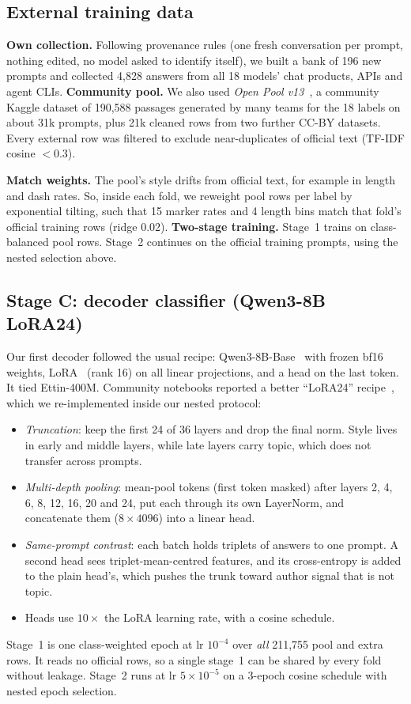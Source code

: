 \documentclass[10pt,twocolumn,letterpaper]{article}
\begin{document}
\subsection{External training data}
\label{sec:external}
\textbf{Own collection.} Following provenance rules (one fresh conversation per prompt, nothing edited, no model asked to identify itself), we built a bank of 196 new prompts and collected 4,828 answers from all 18 models' chat products, APIs and agent CLIs. \textbf{Community pool.} We also used \emph{Open Pool v13}~\cite{kaggle_pool}, a community Kaggle dataset of 190,588 passages generated by many teams for the 18 labels on about 31k prompts, plus 21k cleaned rows from two further CC-BY datasets. Every external row was filtered to exclude near-duplicates of official text (TF-IDF cosine $<0.3$).

\textbf{Match weights.} The pool's style drifts from official text, for example in length and dash rates. So, inside each fold, we reweight pool rows per label by exponential tilting, such that 15 marker rates and 4 length bins match that fold's official training rows (ridge 0.02). \textbf{Two-stage training.} Stage~1 trains on class-balanced pool rows. Stage~2 continues on the official training prompts, using the nested selection above.

\subsection{Stage C: decoder classifier (Qwen3-8B LoRA24)}
Our first decoder followed the usual recipe: Qwen3-8B-Base~\cite{yang2025qwen3} with frozen bf16 weights, LoRA~\cite{hu2022lora} (rank 16) on all linear projections, and a head on the last token. It tied Ettin-400M. Community notebooks reported a better ``LoRA24'' recipe~\cite{kaggle_lora24}, which we re-implemented inside our nested protocol:
\begin{itemize}
\item \emph{Truncation}: keep the first 24 of 36 layers and drop the final norm. Style lives in early and middle layers, while late layers carry topic, which does not transfer across prompts.
\item \emph{Multi-depth pooling}: mean-pool tokens (first token masked) after layers 2, 4, 6, 8, 12, 16, 20 and 24, put each through its own LayerNorm, and concatenate them ($8\times4096$) into a linear head.
\item \emph{Same-prompt contrast}: each batch holds triplets of answers to one prompt. A second head sees triplet-mean-centred features, and its cross-entropy is added to the plain head's, which pushes the trunk toward author signal that is not topic.
\item Heads use $10\times$ the LoRA learning rate, with a cosine schedule.
\end{itemize}
Stage~1 is one class-weighted epoch at lr $10^{-4}$ over \emph{all} 211,755 pool and extra rows. It reads no official rows, so a single stage~1 can be shared by every fold without leakage. Stage~2 runs at lr $5\times10^{-5}$ on a 3-epoch cosine schedule with nested epoch selection.
\end{document}
